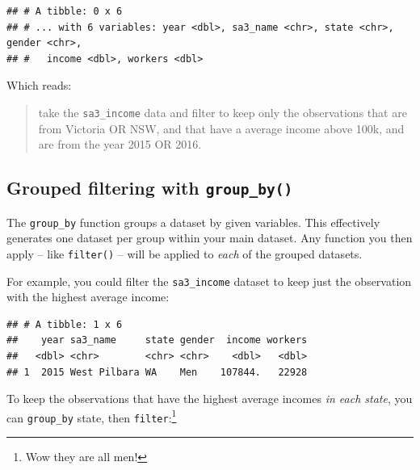 \documentclass[]{book}
\newenvironment{Shaded}{\begin{snugshade}}{\end{snugshade}}
\newcommand{\KeywordTok}[1]{\textcolor[rgb]{0.13,0.29,0.53}{\textbf{#1}}}
\newcommand{\NormalTok}[1]{#1}
\newcommand{\OperatorTok}[1]{\textcolor[rgb]{0.81,0.36,0.00}{\textbf{#1}}}
\newcommand{\StringTok}[1]{\textcolor[rgb]{0.31,0.60,0.02}{#1}}
\begin{document}
\begin{verbatim}
## # A tibble: 0 x 6
## # ... with 6 variables: year <dbl>, sa3_name <chr>, state <chr>, gender <chr>,
## #   income <dbl>, workers <dbl>
\end{verbatim}

Which reads:

\begin{quote}
take the \texttt{sa3\_income} data and filter to keep only the observations that are from Victoria OR NSW, and that have a average income above 100k, and are from the year 2015 OR 2016.
\end{quote}

\hypertarget{grouped-filtering-with-group_by}{%
\subsection{\texorpdfstring{Grouped filtering with \texttt{group\_by()}}{Grouped filtering with group\_by()}}\label{grouped-filtering-with-group_by}}

The \texttt{group\_by} function groups a dataset by given variables. This effectively generates one dataset per group within your main dataset. Any function you then apply -- like \texttt{filter()} -- will be applied to \emph{each} of the grouped datasets.

For example, you could filter the \texttt{sa3\_income} dataset to keep just the observation with the highest average income:

\begin{Shaded}
\end{Shaded}

\begin{verbatim}
## # A tibble: 1 x 6
##    year sa3_name     state gender  income workers
##   <dbl> <chr>        <chr> <chr>    <dbl>   <dbl>
## 1  2015 West Pilbara WA    Men    107844.   22928
\end{verbatim}

To keep the observations that have the highest average incomes \emph{in each state}, you can \texttt{group\_by} state, then \texttt{filter}:\footnote{Wow they are all men!}

\begin{Shaded}
\end{Shaded}
\end{document}
